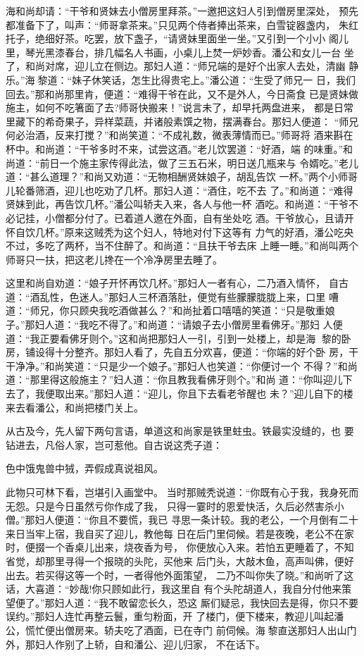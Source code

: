 海和尚却请：“干爷和贤妹去小僧房里拜茶。”一邀把这妇人引到僧房里深处，
预先都准备下了，叫声：“师哥拿茶来。”只见两个侍者捧出茶来，白雪锭器盏内，
朱红托子，绝细好茶。吃罢，放下盏子，“请贤妹里面坐一坐。”又引到一个小小
阁儿里，琴光黑漆春台，排几幅名人书画，小桌儿上焚一炉妙香。潘公和女儿一台
坐了，和尚对席，迎儿立在侧边。那妇人道：“师兄端的是好个出家人去处，清幽
静乐。”海黎道：“妹子休笑话，怎生比得贵宅上。”潘公道：“生受了师兄一
日，我们回去。”那和尚那里肯，便道：“难得干爷在此，又不是外人，今日斋食
已是贤妹做施主，如何不吃箸面了去?师哥快搬来！”说言未了，却早托两盘进来，
都是日常里藏下的希奇果子，异样菜蔬，并诸般素馔之物，摆满春台。那妇人便道：
“师兄何必治酒，反来打搅？”和尚笑道：“不成礼数，微表薄情而已。”师哥将
酒来斟在杯中。和尚道：“干爷多时不来，试尝这酒。”老儿饮罢道：“好酒，端
的味重。”和尚道：“前日一个施主家传得此法，做了三五石米，明日送几瓶来与
令婿吃。”老儿道：“甚么道理？”和尚又劝道：“无物相酬贤妹娘子，胡乱告饮
一杯。”两个小师哥儿轮番筛酒，迎儿也吃劝了几杯。那妇人道：“酒住，吃不去
了。”和尚道：“难得贤妹到此，再告饮几杯。”潘公叫轿夫入来，各人与他一杯
酒吃。和尚道：“干爷不必记挂，小僧都分付了。已着道人邀在外面，自有坐处吃
酒。干爷放心，且请开怀自饮几杯。”原来这贼秃为这个妇人，特地对付下这等有
力气的好酒，潘公吃央不过，多吃了两杯，当不住醉了。和尚道：“且扶干爷去床
上睡一睡。”和尚叫两个师哥只一扶，把这老儿搀在一个冷净房里去睡了。

这里和尚自劝道：“娘子开怀再饮几杯。”那妇人一者有心，二乃酒入情怀，
自古道：“酒乱性，色迷人。”那妇人三杯酒落肚，便觉有些朦朦胧胧上来，口里
嘈道：“师兄，你只顾央我吃酒做甚么？”和尚扯着口嘻嘻的笑道：“只是敬重娘
子。”那妇人道：“我吃不得了。”和尚道：“请娘子去小僧房里看佛牙。”那妇
人便道：“我正要看佛牙则个。”这和尚把那妇人一引，引到一处楼上，却是海
黎的卧房，铺设得十分整齐。那妇人看了，先自五分欢喜，便道：“你端的好个卧
房，干干净净。”和尚笑道：“只是少一个娘子。”那妇人也笑道：“你便讨一个
不得？”和尚道：“那里得这般施主？”妇人道：“你且教我看佛牙则个。”和尚
道：“你叫迎儿下去了，我便取出来。”那妇人道：“迎儿，你且下去看老爷醒也
未？”迎儿自下的楼来去看潘公，和尚把楼门关上。

从古及今，先人留下两句言语，单道这和尚家是铁里蛀虫。铁最实没缝的，也
要钻进去，凡俗人家，岂可惹他。自古说这秃子道：

色中饿鬼兽中狨，弄假成真说祖风。

此物只可林下看，岂堪引入画堂中。
当时那贼秃说道：“你既有心于我，我身死而无怨。只是今日虽然亏你作成了我，
只得一霎时的恩爱快活，久后必然害杀小僧。”那妇人便道：“你且不要慌，我已
寻思一条计较。我的老公，一个月倒有二十来日当牢上宿，我自买了迎儿，教他每
日在后门里伺候。若是夜晚，老公不在家时，便掇一个香桌儿出来，烧夜香为号，
你便放心入来。若怕五更睡着了，不知省觉，却那里寻得一个报晓的头陀，买他来
后门头，大敲木鱼，高声叫佛，便好出去。若买得这等一个时，一者得他外面策望，
二乃不叫你失了晓。”和尚听了这话，大喜道：“妙哉!你只顾如此行，我这里自
有个头陀胡道人，我自分付他来策望便了。”那妇人道：“我不敢留恋长久，恐这
厮们疑忌，我快回去是得，你只不要误约。”那妇人连忙再整云鬟，重匀粉面，开
了楼门，便下楼来，教迎儿叫起潘公，慌忙便出僧房来。轿夫吃了酒面，已在寺门
前伺候。海黎直送那妇人出山门外，那妇人作别了上轿，自和潘公、迎儿归家，
不在话下。

